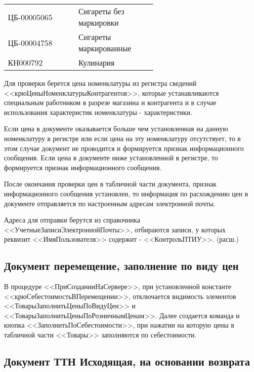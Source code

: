 \vspace{\baselineskip}
\begin{tabular}{p{0.3\linewidth}p{0.3\linewidth}}

	\toprule
	ЦБ-00005065 & Сигареты без маркировки \\
	ЦБ-00004758 & Сигареты маркированные \\

	КН000792 & Кулинария \\
	\bottomrule %
\end{tabular}
\vspace{\baselineskip}\par
Для проверки берется цена номенклатуры из регистра сведений <<крюЦеныНоменклатурыКонтрагентов>>,
которые устанавливаются специальным работником в разрезе магазина и контрагента и в случае использования характеристик номенклатуры - характеристики.\par
Если цена в документе оказывается больше чем установленная на данную номенклатуру в регистре или если цена на эту номенклатуру отсутствует, то в этом случае документ не проводится и формируется признак информационного сообщения. Если цена в документе ниже установленной в регистре, то формируется признак информационного сообщения.\par
После окончания проверки цен в табличной части документа, признак информационного  сообщения установлен, то информация по расхождению цен в документе отправляется по настроенным адресам электронной почты.\par
Адреса для отправки берутся из справочника <<УчетныеЗаписиЭлектроннойПочты>>, отбираются записи, у которых реквизит  <<ИмяПользователя>> содержит - <<КонтрольПТИУ>>.\newline
(расш.)


\subsection{Документ перемещение, заполнение по виду цен}\label{1007}

В процедуре <<ПриСозданииНаСервере>>, при установленной константе <<крюСебестоимостьВПеремещении>>, отключается видимость элементов <<ТоварыЗаполнитьЦеныПоВидуЦен>> и <<ТоварыЗаполнитьЦеныПоРозничнымЦенам>>.
Далее создается команда и кнопка <<ЗаполнитьПоСебестоимости>>, при нажатии на которую цены в табличной части <<Товары>> заполняются по себестоимости.


\subsection{Документ ТТН Исходящая, на основании возврата}\label{1008}

